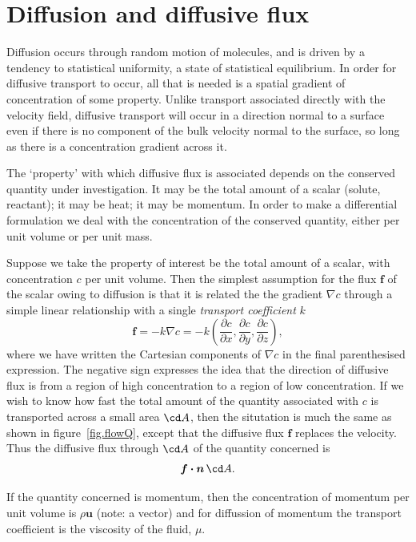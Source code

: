 \documentclass[a4paper,11pt]		{report}
\begin{document}
\section{Diffusion and diffusive flux}

Diffusion occurs through random motion of molecules, and is driven by
a tendency to statistical uniformity, \ie a state of statistical
equilibrium. In order for diffusive transport to occur, all that is
needed is a spatial gradient of concentration of some property. Unlike
transport associated directly with the velocity field, diffusive
transport will occur in a direction normal to a surface even if there
is no component of the bulk velocity normal to the surface, so long as
there is a concentration gradient across it.

The `property' with which diffusive flux is associated depends on the
conserved quantity under investigation. It may be the total amount of
a scalar (\eg solute, reactant); it may be heat; it may be momentum.
In order to make a differential formulation we deal with the
concentration of the conserved quantity, either per unit volume or per
unit mass.

Suppose we take the property of interest be the total amount of a
scalar, with concentration $c$ per unit volume. Then the simplest
assumption for the flux $\bm{f}$ of the scalar owing to diffusion is
that it is related the the gradient $\nabla c$ through a simple linear
relationship with a single \emph{transport coefficient} $k$
\[
\bm{f}=-k\nabla c = -k \left(
 \frac{\partial c}{\partial x},
 \frac{\partial c}{\partial y},
 \frac{\partial c}{\partial z}
\right),
\]
where we have written the Cartesian components of $\nabla c$ in the
final parenthesised expression. The negative sign expresses the idea
that the direction of diffusive flux is from a region of high
concentration to a region of low concentration. If we wish to know how
fast the total amount of the quantity associated with $c$ is
transported across a small area $\cd A$, then the situtation is much
the same as shown in figure~\ref{fig.flowQ}, except that the diffusive
flux $\bm{f}$ replaces the velocity. Thus the diffusive flux through
$\cd A$ of the quantity concerned is
\[
\bm{f\cdot n}\,\cd A.
\]

If the quantity concerned is momentum, then the concentration of
momentum per unit volume is $\rho\bm{u}$ (note: a vector) and for
diffussion of momentum the transport coefficient is the viscosity of the
fluid, $\mu$.
\end{document}
